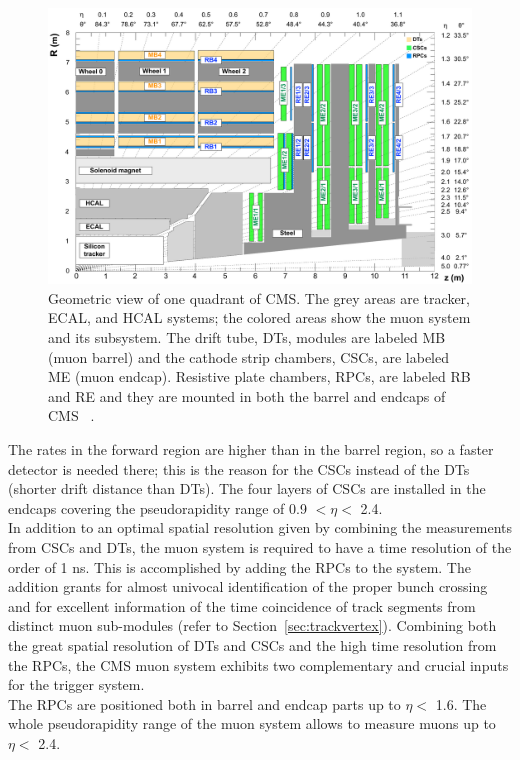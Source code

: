 \begin{figure}[h!]
\centering
\includegraphics[width=0.999\textwidth]{Figures/c2/cms_quadrant_run_ii.pdf}
\caption{Geometric view of one quadrant of CMS. The grey areas are
  tracker, ECAL, and HCAL systems; the colored
  areas show the muon system and its subsystem. The drift tube, DTs,
  modules are labeled MB (muon barrel) and the cathode strip
  chambers, CSCs, are labeled ME (muon endcap). Resistive plate
  chambers, RPCs, are labeled RB and RE and they are mounted in both the barrel and endcaps of CMS
~\cite{muonsystemPU}. }
\label{fig:muonsystem}
\end{figure} 

The rates in the forward region are higher than in the
barrel region, so a faster detector is needed there; this is the
reason for the CSCs instead of the DTs (shorter drift distance than DTs).
The four layers of
CSCs are installed in the endcaps covering the pseudorapidity range of 0.9
$<\eta<$ 2.4. \\
In addition to an optimal spatial resolution given by combining the
measurements from CSCs and DTs, the muon system is required to have a time resolution of
the order of 1 ns. This is accomplished by adding the RPCs to the
system. The addition grants for almost univocal identification of the proper bunch
crossing and for excellent information of the time coincidence of track
segments from distinct
muon sub-modules (refer to Section~\ref{sec:trackvertex}). 
Combining both the great spatial resolution of DTs and CSCs and the
high time resolution from the RPCs,
 the CMS muon system exhibits two
complementary and crucial inputs for the trigger system. \\
The RPCs are positioned both in barrel
and endcap parts up to $\eta<$ 1.6. The whole pseudorapidity range of
the muon system allows to measure muons up to $\eta<$ 2.4.

